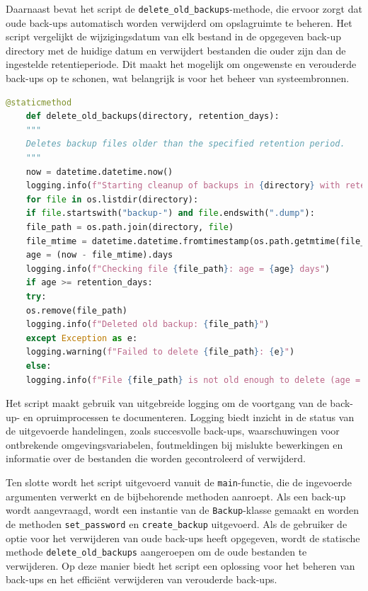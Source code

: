 Daarnaast bevat het script de \texttt{delete\_old\_backups}-methode, die ervoor zorgt dat oude back-ups automatisch worden verwijderd om opslagruimte te beheren. Het script vergelijkt de wijzigingsdatum van elk bestand in de opgegeven back-up directory met de huidige datum en verwijdert bestanden die ouder zijn dan de ingestelde retentieperiode. Dit maakt het mogelijk om ongewenste en verouderde back-ups op te schonen, wat belangrijk is voor het beheer van systeembronnen.
\begin{lstlisting}[language=Python]
    @staticmethod
    def delete_old_backups(directory, retention_days):
    """
    Deletes backup files older than the specified retention period.
    """
    now = datetime.datetime.now()
    logging.info(f"Starting cleanup of backups in {directory} with retention period: {retention_days} days")
    for file in os.listdir(directory):
    if file.startswith("backup-") and file.endswith(".dump"):
    file_path = os.path.join(directory, file)
    file_mtime = datetime.datetime.fromtimestamp(os.path.getmtime(file_path))
    age = (now - file_mtime).days
    logging.info(f"Checking file {file_path}: age = {age} days")
    if age >= retention_days:
    try:
    os.remove(file_path)
    logging.info(f"Deleted old backup: {file_path}")
    except Exception as e:
    logging.warning(f"Failed to delete {file_path}: {e}")
    else:
    logging.info(f"File {file_path} is not old enough to delete (age = {age} days).")
\end{lstlisting}

Het script maakt gebruik van uitgebreide logging om de voortgang van de back-up- en opruimprocessen te documenteren. Logging biedt inzicht in de status van de uitgevoerde handelingen, zoals succesvolle back-ups, waarschuwingen voor ontbrekende omgevingsvariabelen, foutmeldingen bij mislukte bewerkingen en informatie over de bestanden die worden gecontroleerd of verwijderd.

Ten slotte wordt het script uitgevoerd vanuit de \texttt{main}-functie, die de ingevoerde argumenten verwerkt en de bijbehorende methoden aanroept. Als een back-up wordt aangevraagd, wordt een instantie van de \texttt{Backup}-klasse gemaakt en worden de methoden \texttt{set\_password} en \texttt{create\_backup} uitgevoerd. Als de gebruiker de optie voor het verwijderen van oude back-ups heeft opgegeven, wordt de statische methode \texttt{delete\_old\_backups} aangeroepen om de oude bestanden te verwijderen. Op deze manier biedt het script een oplossing voor het beheren van back-ups en het efficiënt verwijderen van verouderde back-ups.

